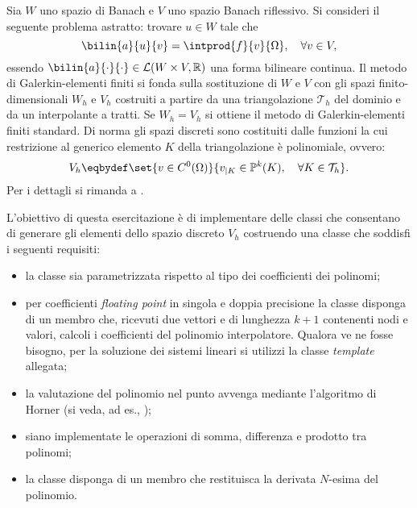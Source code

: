 Sia $W$ uno spazio di Banach e $V$ uno spazio Banach riflessivo. Si
consideri il seguente problema astratto: trovare $u\in W$ tale che
\begin{equation*}
\bilin{a}{u}{v} = \intprod{f}{v}{\Omega},\quad\forall v\in V,
\end{equation*}
essendo $\bilin{a}{\cdot}{\cdot}\in\mathcal{L}(W\times V, \mathbb{R})$
una forma bilineare continua.
Il metodo di Galerkin-elementi finiti si fonda sulla sostituzione
di $W$ e $V$ con gli spazi finito-dimensionali $W_h$ e $V_h$
costruiti a partire da una triangolazione
$\mathcal{T}_h$ del dominio e da un interpolante a tratti. Se
$W_h=V_h$ si ottiene il metodo di Galerkin-elementi finiti
standard. Di norma gli spazi discreti sono costituiti dalle funzioni
la cui restrizione al generico elemento $K$ della triangolazione \`e
polinomiale, ovvero:
\begin{equation*}
V_h \eqbydef \set{v\in
  C^0(\Omega)}{v_{|K}\in\mathbb{P}^k(K),\quad\forall K\in\mathcal{T}_h}.
\end{equation*}
Per i dettagli si rimanda a \cite{Ern.Guermond:2004}.

L'obiettivo di questa esercitazione \`e di implementare delle classi
che consentano di generare gli elementi dello spazio discreto $V_h$
costruendo una classe  che soddisfi i seguenti requisiti:
\begin{itemize}
\item la classe sia parametrizzata rispetto al tipo  dei
  coefficienti dei polinomi;
\item per coefficienti \emph{floating point} in singola e doppia
  precisione la classe disponga di un membro  che,
  ricevuti due vettori  e  di lunghezza $k+1$ contenenti
  nodi e valori, calcoli 
  i coefficienti del polinomio interpolatore. Qualora ve ne fosse
  bisogno, per la soluzione dei sistemi lineari si utilizzi la classe
  \emph{template}  allegata;
\item la valutazione del polinomio nel punto  avvenga mediante
  l'algoritmo di Horner (si veda, ad es.,
  \cite[]{Yang:2001});
\item siano implementate le operazioni di somma, differenza e prodotto
  tra polinomi;
\item la classe disponga di un membro  che restituisca la
  derivata $N$-esima del polinomio.
\end{itemize}

